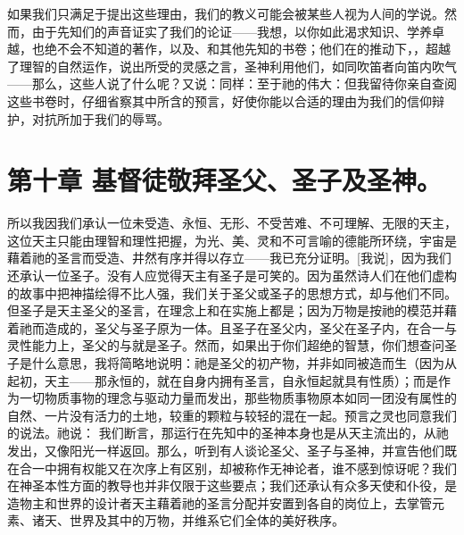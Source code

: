 如果我们只满足于提出这些理由，我们的教义可能会被某些人视为人间的学说。然而，由于先知们的声音证实了我们的论证——我想，以你如此渴求知识、学养卓越，也绝不会不知道的著作，以及、和其他先知的书卷；他们在的推动下，，超越了理智的自然运作，说出所受的灵感之言，圣神利用他们，如同吹笛者向笛内吹气——那么，这些人说了什么呢？又说：同样：至于祂的伟大：但我留待你亲自查阅这些书卷时，仔细省察其中所含的预言，好使你能以合适的理由为我们的信仰辩护，对抗所加于我们的辱骂。\par


\section{第十章 基督徒敬拜圣父、圣子及圣神。}

所以我因我们承认一位未受造、永恒、无形、不受苦难、不可理解、无限的天主，这位天主只能由理智和理性把握，为光、美、灵和不可言喻的德能所环绕，宇宙是藉着祂的圣言而受造、井然有序并得以存立——我已充分证明。[我说]，因为我们还承认一位圣子。没有人应觉得天主有圣子是可笑的。因为虽然诗人们在他们虚构的故事中把神描绘得不比人强，我们关于圣父或圣子的思想方式，却与他们不同。但圣子是天主圣父的圣言，在理念上和在实施上都是；因为万物是按祂的模范并藉着祂而造成的，圣父与圣子原为一体。且圣子在圣父内，圣父在圣子内，在合一与灵性能力上，圣父的与就是圣子。然而，如果出于你们超绝的智慧，你们想查问圣子是什么意思，我将简略地说明：祂是圣父的初产物，并非如同被造而生（因为从起初，天主——那永恒的，就在自身内拥有圣言，自永恒起就具有性质）；而是作为一切物质事物的理念与驱动力量而发出，那些物质事物原本如同一团没有属性的自然、一片没有活力的土地，较重的颗粒与较轻的混在一起。预言之灵也同意我们的说法。祂说： 我们断言，那运行在先知中的圣神本身也是从天主流出的，从祂发出，又像阳光一样返回。那么，听到有人谈论圣父、圣子与圣神，并宣告他们既在合一中拥有权能又在次序上有区别，却被称作无神论者，谁不感到惊讶呢？我们在神圣本性方面的教导也并非仅限于这些要点；我们还承认有众多天使和仆役，是造物主和世界的设计者天主藉着祂的圣言分配并安置到各自的岗位上，去掌管元素、诸天、世界及其中的万物，并维系它们全体的美好秩序。\par

